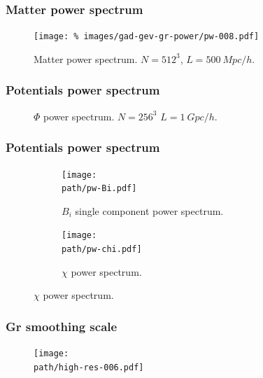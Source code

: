 \documentclass{beamer}
\makeatletter
\newcommand{\mylabel}{%
}
\makeatother
\begin{document}
\begin{frame}[label=matterpowerGR]
    \frametitle{Matter power spectrum\mylabel}
    \vspace*{-.5cm}
    \begin{figure}
    \centering\texttt{[image: \%
        images/gad-gev-gr-power/pw-008.pdf]}%
        \caption{Matter power spectrum. $N=512^3$, $L=\SI{500}{Mpc}/h$.}
    \end{figure}
\end{frame}


\begin{frame}[label=Phipower]
    \frametitle{Potentials power spectrum\mylabel}
    \vspace*{-.5cm}
    \begin{figure}
        \caption{$\Phi$ power spectrum. $N=256^3$ $L=\SI{1}{Gpc}/h$.}
    \end{figure}
\end{frame}

\begin{frame}[label=Bipower]
    \frametitle{Potentials power spectrum\mylabel}
  \def\path{images}%
  \begin{figure}
      \begin{subfigure}[t]{.49\textwidth}
      \texttt{[image: \\path/pw-Bi.pdf]}%
      \caption{$B_i$ single component power spectrum.}
      \end{subfigure}
      \begin{subfigure}[t]{.49\textwidth}
      \texttt{[image: \\path/pw-chi.pdf]}%
      \caption{$\chi$ power spectrum.}
      \end{subfigure}
  \end{figure}
\end{frame}

\begin{frame}[label=grcuttest]
    \frametitle{Gr smoothing scale\mylabel}
  \def\path{images/test-gr-cut}%
  \begin{figure}
      \texttt{[image: \\path/high-res-006.pdf]}%
  \end{figure}
\end{frame}
\end{document}
